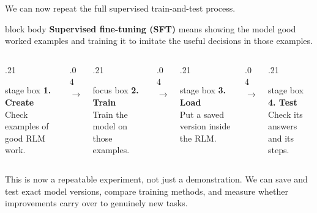 \documentclass[aspectratio=169,11pt]{beamer}
\newcommand{\rlmstagebox}[1]{%
  \begin{beamercolorbox}[wd=\linewidth,sep=.55em,center,rounded=true]{stage box}
    #1
  \end{beamercolorbox}%
}
\newcommand{\rlmfocusbox}[1]{%
  \begin{beamercolorbox}[wd=\linewidth,sep=.55em,center,rounded=true]{focus box}
    #1
  \end{beamercolorbox}%
}
\begin{document}
\begin{frame}{We can now repeat the full supervised train-and-test process.}
  \begin{beamercolorbox}[wd=\linewidth,sep=.75em,rounded=true]{block body}
    \textbf{Supervised fine-tuning (SFT)} means showing the model good worked examples and
    training it to imitate the useful decisions in those examples.
  \end{beamercolorbox}

  \vspace{0.5cm}
  \begin{columns}[c,onlytextwidth]
    \begin{column}{.21\textwidth}
      \rlmstagebox{\textbf{1. Create}\\[.2em]
        \small Check examples of good RLM work.}
    \end{column}
    \begin{column}{.04\textwidth}
      \centering\Large\color{RlmTeal}$\rightarrow$
    \end{column}
    \begin{column}{.21\textwidth}
      \rlmfocusbox{\textbf{2. Train}\\[.2em]
        \small Train the model on those examples.}
    \end{column}
    \begin{column}{.04\textwidth}
      \centering\Large\color{RlmTeal}$\rightarrow$
    \end{column}
    \begin{column}{.21\textwidth}
      \rlmstagebox{\textbf{3. Load}\\[.2em]
        \small Put a saved version inside the RLM.}
    \end{column}
    \begin{column}{.04\textwidth}
      \centering\Large\color{RlmTeal}$\rightarrow$
    \end{column}
    \begin{column}{.21\textwidth}
      \rlmstagebox{\textbf{4. Test}\\[.2em]
        \small Check its answers and its steps.}
    \end{column}
  \end{columns}

  \vspace{0.4cm}
  \begin{block}{This is now a repeatable experiment, not just a demonstration.}
    We can save and test exact model versions, compare training methods, and measure whether
    improvements carry over to genuinely new tasks.
  \end{block}
\end{frame}
\end{document}
